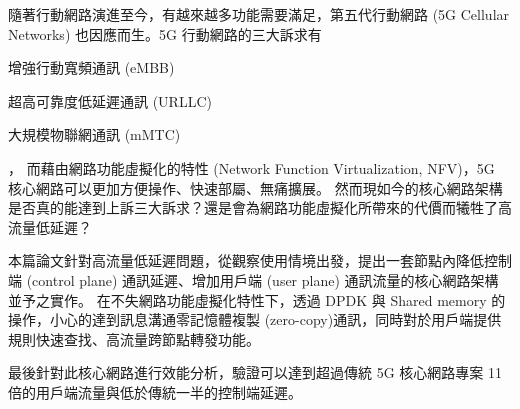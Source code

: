 \begin{abstractzh}

    隨著行動網路演進至今，有越來越多功能需要滿足，第五代行動網路 (5G Cellular Networks) 也因應而生。5G 行動網路的三大訴求有
    \begin{enumerate*}
    \item 增強行動寬頻通訊 (eMBB)
    \item 超高可靠度低延遲通訊 (URLLC)
    \item 大規模物聯網通訊 (mMTC)
    \end{enumerate*}，
    而藉由網路功能虛擬化的特性 (Network Function Virtualization, NFV)，5G 核心網路可以更加方便操作、快速部屬、無痛擴展。
    然而現如今的核心網路架構是否真的能達到上訴三大訴求？還是會為網路功能虛擬化所帶來的代價而犧牲了高流量低延遲？

    本篇論文針對高流量低延遲問題，從觀察使用情境出發，提出一套節點內降低控制端 (control plane) 通訊延遲、增加用戶端 (user plane) 通訊流量的核心網路架構並予之實作。
    在不失網路功能虛擬化特性下，透過 DPDK 與 Shared memory 的操作，小心的達到訊息溝通零記憶體複製 (zero-copy)通訊，同時對於用戶端提供規則快速查找、高流量跨節點轉發功能。

    最後針對此核心網路進行效能分析，驗證可以達到超過傳統 5G 核心網路專案 11 倍的用戶端流量與低於傳統一半的控制端延遲。

\end{abstractzh}

